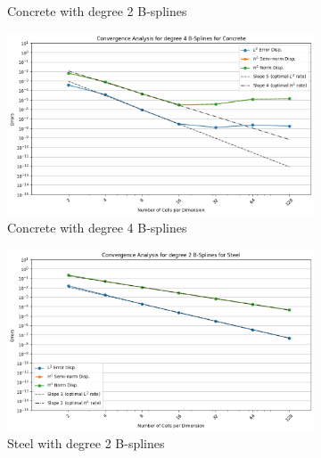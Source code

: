 \documentclass[a4paper,12pt,twoside]{report}
\begin{document}
\begin{figure}[!h]
\begin{subfigure}[b]{0.49\textwidth}
		\caption{Concrete with degree 2 B-splines}
		\label{fig:concrete_degree_2}
	\end{subfigure}
	\begin{subfigure}[b]{0.49\textwidth}
		\centering
		\includegraphics[width=\textwidth]{figures/figures_non_mixed_realistic/convergence_plot_degree_4_lambda=17000000000.0.png}
		\caption{Concrete with degree 4 B-splines}
		\label{fig:concrete_degree_4}
	\end{subfigure}
	\centering
	\begin{subfigure}[b]{0.49\textwidth}
		\centering
		\includegraphics[width=\textwidth]{figures/figures_non_mixed_realistic/convergence_plot_degree_2_lambda=120000000000.0.png}
		\caption{Steel with degree 2 B-splines}
		\label{fig:steel_degree_2}
	\end{subfigure}
	\begin{subfigure}[b]{0.49\textwidth}
		\centering

\end{subfigure}
\end{figure}
\end{document}

